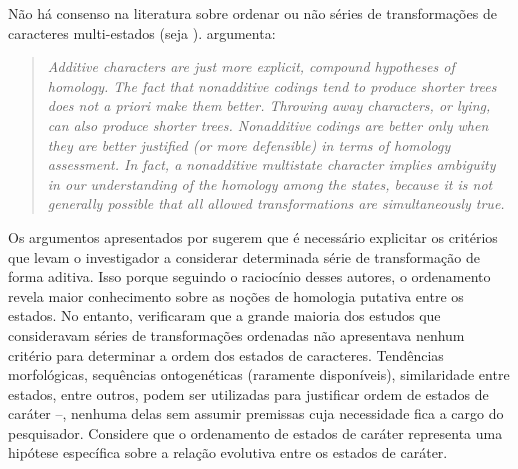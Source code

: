 \begin{refsection}

Não há consenso na literatura sobre ordenar ou não séries de transformações de caracteres multi-estados (seja \parencite{Hauser_and_Presch_1991, Slowinski_1993, Nixon_and_Carpenter_2011}). \textcite[][:8]{Nixon_and_Carpenter_2011} argumenta: 

\begin{quotation}
\textit{Additive characters are just more explicit, compound hypotheses of homology. The fact that nonadditive codings tend to produce shorter trees does not a priori make them better. Throwing away characters, or lying, can also produce shorter trees. Nonadditive codings are better only when they are better justified (or more defensible) in terms of homology assessment. In fact, a nonadditive multistate character implies ambiguity in our understanding of the homology among the states, because it is not generally possible that all allowed transformations are simultaneously true.}
\end{quotation}

Os argumentos apresentados por \textcite{Nixon_and_Carpenter_2011} sugerem que é necessário explicitar os critérios que levam o investigador a considerar determinada série de transformação de forma aditiva. Isso porque seguindo o raciocínio desses autores, o ordenamento revela maior conhecimento sobre as noções de homologia putativa entre os estados. No entanto, \textcite{Hauser_and_Presch_1991} verificaram que a grande maioria dos estudos que consideravam séries de transformações ordenadas não apresentava nenhum critério para determinar a ordem dos estados de caracteres. Tendências morfológicas, sequências ontogenéticas (raramente disponíveis), similaridade entre estados, entre outros, podem ser utilizadas para justificar ordem de estados de caráter \parencite[mas veja][]{Hauser_and_Presch_1991} --, nenhuma delas sem assumir premissas cuja necessidade fica a cargo do pesquisador. Considere que o ordenamento de estados de caráter representa uma hipótese específica sobre a relação evolutiva entre os estados de caráter. 


\end{refsection}
